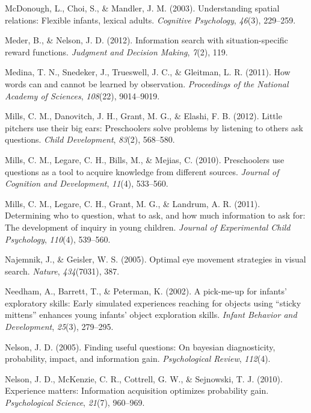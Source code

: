 \documentclass[english,floatsintext,man]{apa6}
\theoremstyle{definition}
\theoremstyle{definition}
\theoremstyle{definition}
\theoremstyle{remark}
\begin{document}
\hypertarget{ref-mcdonough2003understanding}{}
McDonough, L., Choi, S., \& Mandler, J. M. (2003). Understanding spatial
relations: Flexible infants, lexical adults. \emph{Cognitive
Psychology}, \emph{46}(3), 229--259.

\hypertarget{ref-meder2012information}{}
Meder, B., \& Nelson, J. D. (2012). Information search with
situation-specific reward functions. \emph{Judgment and Decision
Making}, \emph{7}(2), 119.

\hypertarget{ref-medina2011words}{}
Medina, T. N., Snedeker, J., Trueswell, J. C., \& Gleitman, L. R.
(2011). How words can and cannot be learned by observation.
\emph{Proceedings of the National Academy of Sciences}, \emph{108}(22),
9014--9019.

\hypertarget{ref-mills2012little}{}
Mills, C. M., Danovitch, J. H., Grant, M. G., \& Elashi, F. B. (2012).
Little pitchers use their big ears: Preschoolers solve problems by
listening to others ask questions. \emph{Child Development},
\emph{83}(2), 568--580.

\hypertarget{ref-mills2010preschoolers}{}
Mills, C. M., Legare, C. H., Bills, M., \& Mejias, C. (2010).
Preschoolers use questions as a tool to acquire knowledge from different
sources. \emph{Journal of Cognition and Development}, \emph{11}(4),
533--560.

\hypertarget{ref-mills2011determining}{}
Mills, C. M., Legare, C. H., Grant, M. G., \& Landrum, A. R. (2011).
Determining who to question, what to ask, and how much information to
ask for: The development of inquiry in young children. \emph{Journal of
Experimental Child Psychology}, \emph{110}(4), 539--560.

\hypertarget{ref-najemnik2005optimal}{}
Najemnik, J., \& Geisler, W. S. (2005). Optimal eye movement strategies
in visual search. \emph{Nature}, \emph{434}(7031), 387.

\hypertarget{ref-needham2002pick}{}
Needham, A., Barrett, T., \& Peterman, K. (2002). A pick-me-up for
infants' exploratory skills: Early simulated experiences reaching for
objects using ``sticky mittens'' enhances young infants' object
exploration skills. \emph{Infant Behavior and Development},
\emph{25}(3), 279--295.

\hypertarget{ref-nelson2005finding}{}
Nelson, J. D. (2005). Finding useful questions: On bayesian
diagnosticity, probability, impact, and information gain.
\emph{Psychological Review}, \emph{112}(4).

\hypertarget{ref-nelson2010experience}{}
Nelson, J. D., McKenzie, C. R., Cottrell, G. W., \& Sejnowski, T. J.
(2010). Experience matters: Information acquisition optimizes
probability gain. \emph{Psychological Science}, \emph{21}(7), 960--969.
\end{document}
